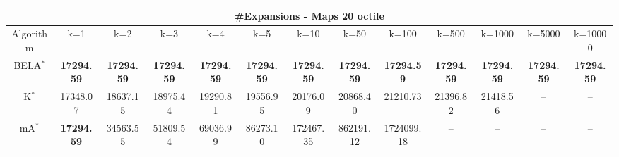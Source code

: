 \begin{tabular}{c|cccccccccccc}\toprule
\multicolumn{13}{c}{#Expansions - Maps 20 octile}\\ \midrule
Algorithm & k=1 & k=2 & k=3 & k=4 & k=5 & k=10 & k=50 & k=100 & k=500 & k=1000 & k=5000 & k=10000 \\ \midrule
BELA$^*$ & \textbf{17294.59} & \textbf{17294.59} & \textbf{17294.59} & \textbf{17294.59} & \textbf{17294.59} & \textbf{17294.59} & \textbf{17294.59} & \textbf{17294.59} & \textbf{17294.59} & \textbf{17294.59} & \textbf{17294.59} & \textbf{17294.59} \\
K$^*$ & 17348.07 & 18637.15 & 18975.44 & 19290.81 & 19556.95 & 20176.09 & 20868.40 & 21210.73 & 21396.82 & 21418.56 & -- & -- \\
mA$^*$ & \textbf{17294.59} & 34563.55 & 51809.54 & 69036.99 & 86273.10 & 172467.35 & 862191.12 & 1724099.18 & -- & -- & -- & -- \\ \bottomrule 
\end{tabular}
